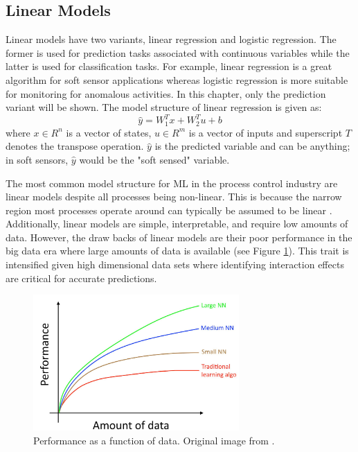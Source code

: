 \subsection{Linear Models}
Linear models have two variants, linear regression and logistic regression.  The former is used for prediction tasks associated with continuous variables while the latter is used for classification tasks.  For example, linear regression is a great algorithm for soft sensor applications whereas logistic regression is more suitable for monitoring for anomalous activities. In this chapter, only the prediction variant will be shown. The model structure of linear regression is given as:
\begin{equation}
    \hat{y} = W_1^Tx + W_2^Tu + b
    \label{eq:02LS}
\end{equation}
where $x \in R^n$ is a vector of states, $u \in R^{m}$ is a vector of inputs and superscript $T$ denotes the transpose operation.  $\hat{y}$ is the predicted variable and can be anything; in soft sensors, $\hat{y}$ would be the "soft sensed" variable.  

The most common model structure for ML in the process control industry are linear models despite all processes being non-linear.  This is because the narrow region most processes operate around can typically be assumed to be linear \cite{process_control_ref13}.  Additionally, linear models are simple, interpretable, and require low amounts of data. However, the draw backs of linear models are their poor performance in the big data era where large amounts of data is available (see Figure \ref{fig:02learning_aggro}).  This trait is intensified given high dimensional data sets where identifying interaction effects are critical for accurate predictions.

\begin{figure}
    \centering
    \includegraphics[width=0.7\textwidth]{images/ch2/02Learning_Aggro.png}
    \caption{Performance as a function of data.  Original image from \cite{deeplearning_course}.}
    \label{fig:02learning_aggro}
\end{figure}

